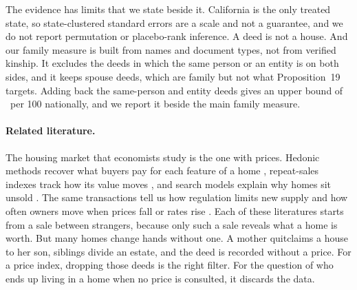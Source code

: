 The evidence has limits that we state beside it. California is the only treated state, so state-clustered standard errors are a scale and not a guarantee, and we do not report permutation or placebo-rank inference. A deed is not a house. And our family measure is built from names and document types, not from verified kinship. It excludes the deeds in which the same person or an entity is on both sides, and it keeps spouse deeds, which are family but not what Proposition~19 targets. Adding back the same-person and entity deeds gives an upper bound of \DeedInclNationalShare\ per 100 nationally, and we report it beside the main family measure.

\paragraph{Related literature.} The housing market that economists study is the one with prices. Hedonic methods recover what buyers pay for each feature of a home \citep{rosen1974hedonic}, repeat-sales indexes track how its value moves \citep{baileymuthnourse1963regression,case1989efficiency}, and search models explain why homes sit unsold \citep{wheaton1990vacancy,genesovemayer2001loss,genesove2012search,ngai2014hot,piazzesi2020segmented}. The same transactions tell us how regulation limits new supply \citep{glaesergyourkosaks2005manhattan,hsiehmoretti2019housing} and how often owners move when prices fall or rates rise \citep{ferreiragyourkotracy2010busts,fonsecaliu2024lockin}. Each of these literatures starts from a sale between strangers, because only such a sale reveals what a home is worth. But many homes change hands without one. A mother quitclaims a house to her son, siblings divide an estate, and the deed is recorded without a price. For a price index, dropping those deeds is the right filter. For the question of who ends up living in a home when no price is consulted, it discards the data.

